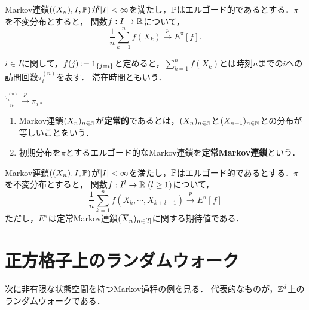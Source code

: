 \documentclass[uplatex,dvipdfmx]{jsreport}
\begin{document}
\begin{theorem}[大数の弱法則]\label{thm-law-of-large-number-of-Markov-chain}
    Markov連鎖$((X_n),I,\mathbb{P})$が$\lvert I\rvert<\infty$を満たし，$\mathbb{P}$はエルゴード的であるとする．$\pi$を不変分布とすると，
    関数$f:I\to\mathbb{R}$について，
    \[\frac{1}{n}\sum_{k=1}^nf(X_k)\xrightarrow{p}E^\pi[f].\]
\end{theorem}

\begin{definition}
    $i\in I$に関して，$f(j):=1_{\left\{j=i\right\}}$と定めると，$\sum^n_{k=1}f(X_k)$とは時刻$n$までの$i$への訪問回数$\tau^{(n)}_i$を表す．
    滞在時間ともいう．
\end{definition}

\begin{corollary}
    $\frac{\tau_i^{(n)}}{n}\xrightarrow{p}\pi_i$．
\end{corollary}

\begin{definition}[stationarity]\mbox{}
    \begin{enumerate}
        \item Markov連鎖$(X_n)_{n\in\mathbb{N}}$が\textbf{定常的}であるとは，$(X_n)_{n\in\mathbb{N}}$と$(X_{n+1})_{n\in\mathbb{N}}$との分布が等しいことをいう．
        \item 初期分布を$\pi$とするエルゴード的なMarkov連鎖を\textbf{定常Markov連鎖}という．
    \end{enumerate}
\end{definition}

\begin{theorem}[高次元化]
    Markov連鎖$((X_n),I,\mathbb{P})$が$\lvert I\rvert<\infty$を満たし，$\mathbb{P}$はエルゴード的であるとする．$\pi$を不変分布とすると，
    関数$f:I^l\to\mathbb{R}\;(l\ge1)$について，
    \[\frac{1}{n}\sum_{k=1}^nf(X_k,\cdots,X_{k+l-1})\xrightarrow{p}E^\pi[f]\]
    ただし，$E^\pi$は定常Markov連鎖$(\overline{X}_n)_{n\in[l]}$に関する期待値である．
\end{theorem}

\section{正方格子上のランダムウォーク}

\begin{tcolorbox}[colframe=ForestGreen, colback=ForestGreen!10!white,breakable,colbacktitle=ForestGreen!40!white,coltitle=black,fonttitle=\bfseries\sffamily,
title=]
    次に非有限な状態空間を持つMarkov過程の例を見る．
    代表的なものが，$\mathbb{Z}^d$上のランダムウォークである．
\end{tcolorbox}
\end{document}
